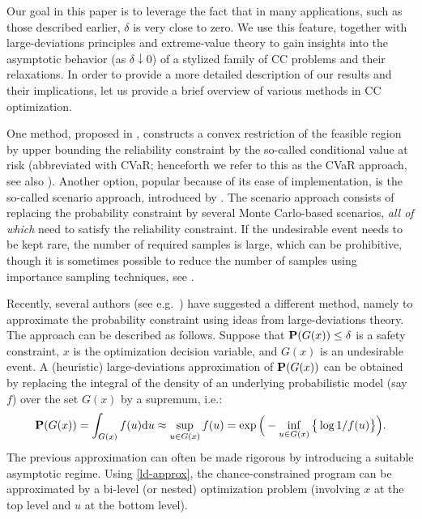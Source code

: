\documentclass[a4paper, a4wide, 10pt, reqno]{amsart}
\theoremstyle{plain}
\newcommand{\rd}{\mathrm{d}}
\begin{document}
Our goal in this paper is to leverage the fact that in many applications, such as those described earlier, $\delta$ is very close to zero. We use this feature, together with large-deviations principles and extreme-value theory to gain insights into the asymptotic behavior (as $\delta \downarrow 0$) of a stylized family of CC problems and their relaxations. In order to provide a more detailed description of our results and their implications, let us provide a brief overview of various methods in CC optimization.

One method, proposed in \cite{nemirovski2006convex}, constructs a convex restriction of the feasible region by upper bounding the reliability constraint by the so-called conditional value at risk (abbreviated with CVaR; henceforth we refer to this as the CVaR approach, see also \cite{RockUry02}). Another option, popular because of its ease of implementation, is the so-called scenario approach, introduced by \cite{calafiore2006scenario}. The scenario approach consists of replacing the probability constraint by several Monte Carlo-based scenarios, \emph{all of which} need to satisfy the reliability constraint. If the undesirable event needs to be kept rare, the number of required samples is large, which can be prohibitive, though 
it is sometimes possible to reduce the number of samples using importance sampling techniques, see \cite{nemirovski2006scenario, barrera2016chance, BZZ23}.

Recently, several authors (see e.g.\ \cite{Subramanyam2020, NNZ19, tong2020optimization}) have suggested a different method, namely to approximate the probability constraint using ideas from large-deviations theory. The approach can be described as follows. Suppose that ${\bf P}(G(x)) \leq \delta$ is a safety constraint, $x$ is the optimization decision variable, and $G(x)$ is an undesirable event. A (heuristic) large-deviations approximation of ${\bf P} (G(x))$ can be obtained by replacing the integral of the density of an underlying probabilistic model (say $f$) over the set $G(x)$ by a supremum, i.e.: 
\begin{equation}
\label{ld-approx}
    {\bf P}(G(x)) = \int_{G(x)} f(u) \rd u \approx \sup_{u\in G(x)} f(u) = \exp\Big(- \inf_{u\in G(x)} \big\{\log 1/f(u)\big\}\Big).
\end{equation}
The previous approximation can often be made rigorous by introducing a suitable asymptotic regime. Using \eqref{ld-approx}, the chance-constrained program can be approximated by a bi-level (or nested) optimization problem (involving $x$ at the top level and $u$ at the bottom level). 
\end{document}
